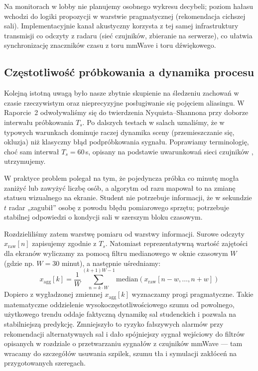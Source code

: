 \documentclass[14pt,a4paper]{extarticle}
\begin{document}
Na monitorach w lobby nie planujemy osobnego wykresu decybeli; poziom hałasu wchodzi do logiki propozycji w warstwie pragmatycznej (rekomendacja cichszej sali). Implementacyjnie kanał akustyczny korzysta z tej samej infrastruktury transmisji co odczyty z radaru (sieć czujników, zbieranie na serwerze), co ułatwia synchronizację znaczników czasu z toru mmWave i toru dźwiękowego.

\subsection{Częstotliwość próbkowania a dynamika procesu}
Kolejną istotną uwagą było nasze zbytnie skupienie na śledzeniu zachowań w czasie rzeczywistym oraz nieprecyzyjne posługiwanie się pojęciem aliasingu. W Raporcie~2 odwoływaliśmy się do twierdzenia Nyquista--Shannona przy doborze interwału próbkowania $T_s$. Po dalszych testach w salach uznaliśmy, że w typowych warunkach dominuje raczej dynamika sceny (przemieszczanie się, okluzja) niż klasyczny błąd podpróbkowania sygnału. Poprawiamy terminologię, choć sam interwał $T_s = 60$\,s, opisany na podstawie uwarunkowań sieci czujników \cite{texas_mmwave}, utrzymujemy.

W praktyce problem polegał na tym, że pojedyncza próbka co minutę mogła zaniżyć lub zawyżyć liczbę osób, a algorytm od razu mapował to na zmianę statusu wizualnego na ekranie. Student nie potrzebuje informacji, że w sekundzie $t$ radar „zagubił” osobę z powodu błędu pomiarowego sprzętu; potrzebuje stabilnej odpowiedzi o kondycji sali w szerszym bloku czasowym.

Rozdzieliliśmy zatem warstwę pomiaru od warstwy informacji. Surowe odczyty $x_{\text{raw}}[n]$ zapisujemy zgodnie z $T_s$. Natomiast reprezentatywną wartość zajętości dla ekranów wyliczamy za pomocą filtru medianowego w oknie czasowym $W$ (gdzie np. $W = 30$ minut), a następnie uśredniamy:
\begin{equation}
    x_{\text{agg}}[k] = \frac{1}{W} \sum_{n=k \cdot W}^{(k+1)W - 1} \text{median}(x_{\text{raw}}[n-w, \dots, n+w])
\end{equation}
Dopiero z wygładzonej zmiennej $x_{\text{agg}}[k]$ wyznaczamy progi pragmatyczne. Takie matematyczne oddzielenie wysokoczęstotliwościowego szumu od powolnego, użytkowego trendu oddaje faktyczną dynamikę sal studenckich i pozwala na stabilniejszą predykcję. Zmniejszyło to ryzyko fałszywych alarmów przy rekomendacji alternatywnych sal i dało spójniejszy sygnał wejściowy do filtrów opisanych w rozdziale o przetwarzaniu sygnałów z czujników mmWave --- tam wracamy do szczegółów usuwania szpilek, szumu tła i symulacji zakłóceń na przygotowanych szeregach.
\end{document}
